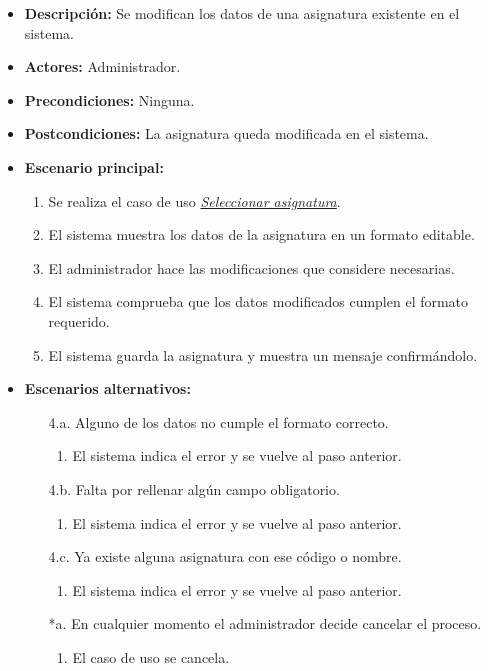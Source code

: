 \documentclass{book}
\begin{document}
\begin{itemize}
\item{\bf Descripción:} Se modifican los datos de una asignatura existente en el sistema.
\item{\bf Actores:} Administrador.
\item{\bf Precondiciones:} Ninguna.
\item{\bf Postcondiciones:} La asignatura queda modificada en el sistema.
\item{\bf Escenario principal:}
	\begin{enumerate}
	\item Se realiza el caso de uso {\em \hyperref[select_asignatura]{Seleccionar asignatura}}.
	\item El sistema muestra los datos de la asignatura en un formato editable.
	\item El administrador hace las modificaciones que considere necesarias.
	\item El sistema comprueba que los datos modificados cumplen el formato requerido.
	\item El sistema guarda la asignatura y muestra un mensaje confirmándolo.
	\end{enumerate}
\item{\bf Escenarios alternativos:}
	\begin{itemize}
	\item[4.a.] Alguno de los datos no cumple el formato correcto.
		\begin{enumerate}
		\item El sistema indica el error y se vuelve al paso anterior.
		\end{enumerate}
	\item[4.b.] Falta por rellenar algún campo obligatorio.
		\begin{enumerate}
		\item El sistema indica el error y se vuelve al paso anterior.
		\end{enumerate}
	\item[4.c.] Ya existe alguna asignatura con ese código o nombre.
		\begin{enumerate}
		\item El sistema indica el error y se vuelve al paso anterior.
		\end{enumerate}
	\item[*a.] En cualquier momento el administrador decide cancelar el proceso.
		\begin{enumerate}
		\item El caso de uso se cancela.
		\end{enumerate}
	\end{itemize}
\end{itemize}
\end{document}
